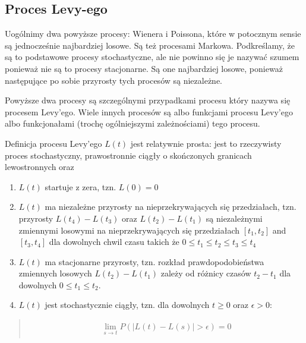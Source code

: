 \documentclass[a4paper,12pt,polish]{sphinxmanual}
\begin{document}
\subsection{Proces Levy-ego}
\label{ch3/chIII021:proces-levy-ego}
Uogólnimy dwa powyższe procesy: Wienera i Poissona, które w potocznym sensie są jednocześnie najbardziej losowe. Są też procesami Markowa. Podkreślamy, że są to podstawowe procesy stochastyczne, ale nie powinno się je nazywać szumem ponieważ nie są to procesy stacjonarne. Są one najbardziej losowe, ponieważ następujące po sobie przyrosty tych procesów są niezależne.

Powyższe dwa procesy są szczególnymi przypadkami procesu który nazywa się procesem Levy'ego. Wiele innych procesów są albo funkcjami procesu Levy'ego albo funkcjonałami (trochę ogólniejszymi zależnościami) tego procesu.

Definicja procesu Levy'ego $L(t)$ jest relatywnie prosta: jest to rzeczywisty proces stochastyczny, prawostronnie ciągły o skończonych granicach lewostronnych oraz
\begin{enumerate}
\item {} 
$L(t)$ startuje z zera, tzn. $L(0)=0$

\item {} 
$L(t)$ ma niezależne przyrosty na nieprzekrywających się przedziałach, tzn. przyrosty $L(t_4) -L(t_3)$ oraz $L(t_2) -L(t_1)$ są niezależnymi zmiennymi losowymi na nieprzekrywających się przedziałach $[t_1, t_2]$ and $[t_3, t_4]$ dla dowolnych chwil czasu takich że $0 \le t_1 \le t_2 \le t_3 \le t_4$

\item {} 
$L(t)$ ma stacjonarne przyrosty, tzn. rozkład prawdopodobieństwa zmiennych losowych $L(t_2) -L(t_1)$ zależy od różnicy czasów $t_2 -t_1$ dla dowolnych $0 \le t_1 \le t_2$.

\item {} 
$L(t)$ jest stochastycznie ciągły, tzn. dla dowolnych $t \ge 0$ oraz $\epsilon > 0$:

\end{enumerate}
\begin{quote}
\label{ch3/chIII021:equation-eqn49}\begin{gather}
\begin{split}\lim_{s\to t} P(|L(t) -L(s)|>\epsilon)=0\end{split}\label{ch3/chIII021-eqn49}
\end{gather}\end{quote}
\end{document}
